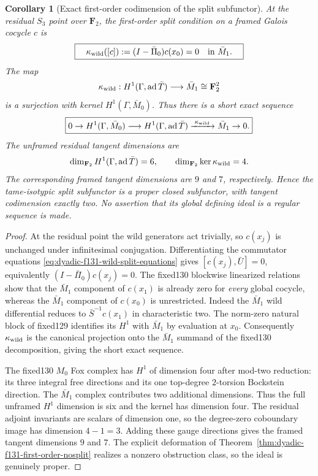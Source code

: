 \documentclass[11pt]{article}
\newtheorem{corollary}[theorem]{Corollary}
\theoremstyle{definition}
\begin{document}
\begin{corollary}[Exact first-order codimension of the split subfunctor]
\label{cor:dyadic-f131-split-tangent-codimension}
At the residual $S_3$
point over $\mathbf F_2$,
the first-order split
condition on a framed
Galois cocycle $c$ is
\begin{equation}\label{eq:dyadic-f131-tangent-wild-character}
\boxed{\quad
\kappa_{\rm wild}([c])
:=(I-\bar\Pi_0)c(x_0)=0
\quad\text{in }\bar M_1.
\quad}
\end{equation}
The map
\[
\kappa_{\rm wild}:
H^1(\Gamma,\operatorname{ad}\bar T)
\longrightarrow\bar M_1
\cong\mathbf F_2^2
\]
is a \emph{surjection}
with kernel
$H^1(\Gamma,\bar M_0)$.
Thus there is a short
exact sequence
\begin{equation}\label{eq:dyadic-f131-tangent-exact-sequence}
\boxed{
0\to H^1(\Gamma,\bar M_0)
\longrightarrow
H^1(\Gamma,\operatorname{ad}\bar T)
\xrightarrow{\;\kappa_{\rm wild}\;}
\bar M_1\to0.
}
\end{equation}
The unframed residual
tangent dimensions are
\[
\dim_{\mathbf F_2}H^1(\Gamma,\operatorname{ad}\bar T)=6,
\qquad
\dim_{\mathbf F_2}\ker\kappa_{\rm wild}=4.
\]
The corresponding framed
tangent dimensions are
$9$ and $7$, respectively.
Hence the tame-isotypic
split subfunctor is a
\emph{proper} closed
subfunctor, with tangent
codimension exactly two.
No assertion that its
global defining ideal is
a regular sequence is made.
\end{corollary}

\begin{proof}
At the residual point
the wild generators
act trivially, so
$c(x_j)$ is unchanged
under infinitesimal
conjugation.
Differentiating the
commutator equations
\eqref{eq:dyadic-f131-wild-split-equations}
gives
$[c(x_j),\bar U]=0$,
equivalently
$(I-\bar\Pi_0)c(x_j)=0$.
The fixed130 blockwise
linearized relations show
that the $\bar M_1$
component of $c(x_1)$
is already zero for
\emph{every} global
cocycle, whereas the
$\bar M_1$ component of
$c(x_0)$ is unrestricted.
Indeed the $\bar M_1$
wild differential reduces
to $\bar S^{-1}c(x_1)$
in characteristic two.
The norm-zero natural
block of fixed129
identifies its $H^1$
with $\bar M_1$ by
evaluation at $x_0$.
Consequently
$\kappa_{\rm wild}$
is the canonical
projection onto the
$\bar M_1$ summand of
the fixed130
decomposition, giving
the short exact
sequence.

The fixed130 $M_0$
Fox complex has
$H^1$ of dimension
four after mod-two
reduction: its three
integral free directions
and its one top-degree
$2$-torsion Bockstein
direction.
The $\bar M_1$
complex contributes two
additional dimensions.
Thus the full unframed
$H^1$ dimension is six
and the kernel has
dimension four.
The residual adjoint
invariants are scalars
of dimension one, so
the degree-zero
coboundary image has
dimension $4-1=3$.
Adding these gauge
directions gives the
framed tangent
dimensions $9$ and $7$.
The explicit deformation
of
Theorem~\ref{thm:dyadic-f131-first-order-nosplit}
realizes a nonzero
obstruction class, so
the ideal is genuinely
proper.
\end{proof}
\end{document}
